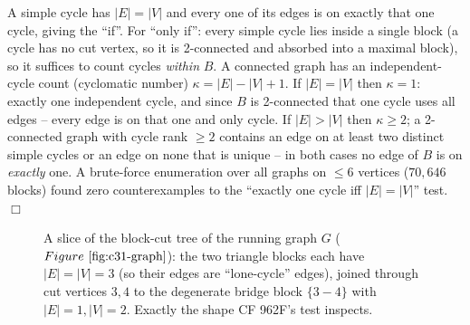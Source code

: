 \begin{proofbox}
A simple cycle has \(|E|=|V|\) and every one of its edges is on exactly that one
cycle, giving the ``if''.  For ``only if'': every simple cycle lies inside a single
block (a cycle has no cut vertex, so it is 2-connected and absorbed into a maximal
block), so it suffices to count cycles \emph{within} \(B\).  A connected graph has an
independent-cycle count (cyclomatic number) \(\kappa=|E|-|V|+1\).  If \(|E|=|V|\) then
\(\kappa=1\): exactly one independent cycle, and since \(B\) is 2-connected that one
cycle uses all edges -- every edge is on that one and only cycle.  If \(|E|>|V|\) then
\(\kappa\ge2\); a 2-connected graph with cycle rank \(\ge2\) contains an edge on at
least two distinct simple cycles or an edge on none that is unique -- in both cases no
edge of \(B\) is on \emph{exactly} one.  A brute-force enumeration over all graphs on
\(\le6\) vertices (\(70{,}646\) blocks) found zero counterexamples to the ``exactly one
cycle iff \(|E|=|V|\)'' test. \(\Box\)
\end{proofbox}

\begin{figure}[H]
\centering
{}
\caption{A slice of the block-cut tree of the running graph \(G\) (\(\figref{c31-graph}\)):
the two triangle blocks each have \(|E|=|V|=3\) (so their edges are ``lone-cycle'' edges),
joined through cut vertices \(3,4\) to the degenerate bridge block \(\{3\!-\!4\}\) with
\(|E|=1,|V|=\!2\).  Exactly the shape CF 962F's test inspects.}
\label{fig:c31-bct}
\end{figure}

